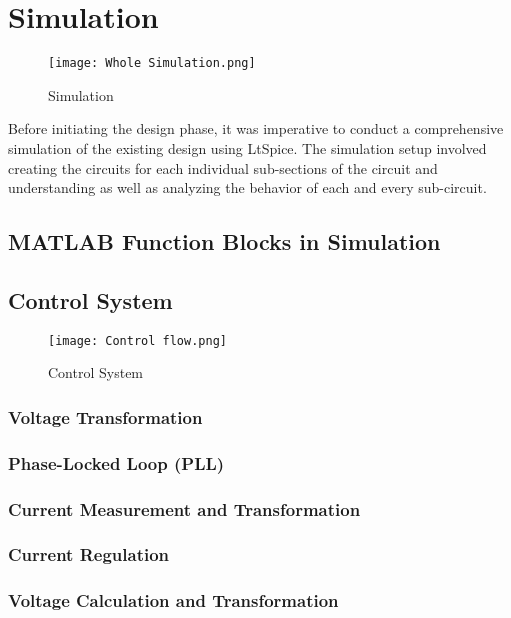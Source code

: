 \section{Simulation}
\begin{figure}[ht]
    \centering
    \texttt{[image: Whole Simulation.png]}
    \caption{Simulation}
    \label{fig:Simulation}
\end{figure}
\noindent
Before initiating the design phase, it was imperative to conduct a
comprehensive simulation of the existing design using LtSpice. The simulation
setup involved creating the circuits for each individual sub-sections of the
circuit and understanding as well as analyzing the behavior of each and every
sub-circuit.

\subsection{MATLAB Function Blocks in Simulation}

\subsection{Control System}
\begin{figure}[ht]
    \centering
    \texttt{[image: Control flow.png]}
    \caption{Control System}
    \label{fig:Control System}
\end{figure}
\subsubsection{Voltage Transformation}


\subsubsection{Phase-Locked Loop (PLL)}


\subsubsection{Current Measurement and Transformation}


\subsubsection{Current Regulation}


\subsubsection{Voltage Calculation and Transformation}


